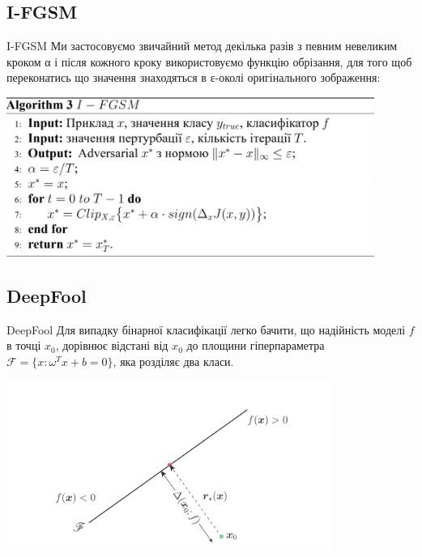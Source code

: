 \documentclass[aspectratio=169]{beamer}
\newcommand{\tran}{^{T}}
\begin{document}
	
	\subsection{I-FGSM}
	\begin{frame}{I-FGSM}
		Ми застосовуємо звичайний метод декілька разів з певним невеликим кроком α і після кожного кроку використовуємо функцію обрізання, для того щоб переконатись що значення знаходяться в ε-околі оригінального зображення:
		\newline
		
		\centering
		\includegraphics[width=0.9\textwidth]{resources/alg_i-fgsm.png}		
	\end{frame}


	\subsection{DeepFool}
	\begin{frame}{DeepFool}
		Для випадку бінарної класифікації легко бачити, що надійність моделі $f$ в точці $ x_{0}$, дорівнює відстані від $x_{0}$ до площини гіперпараметра $\mathscr{F} = \{ x: \omega\tran x + b = 0 \}$, яка розділяє два класи.
		\begin{center}
			\includegraphics[width=0.8\textwidth]{../CourseWorkLatex/resources/deepfool.jpg}
		\end{center}
	\end{frame}
\end{document}
